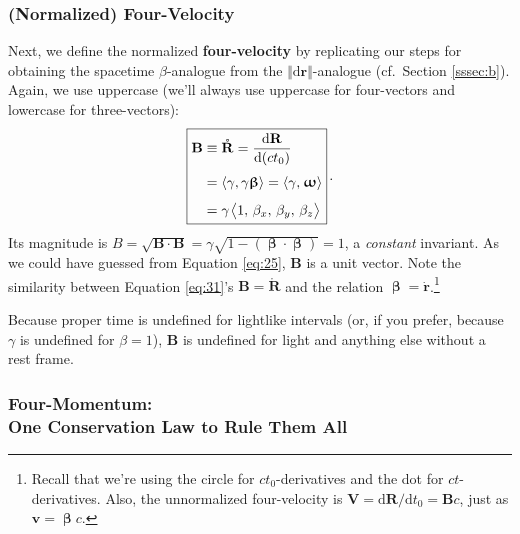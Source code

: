 \documentclass[12pt]{article}
\renewcommand{\vv}[1]{\mathbf{#1}}
\newcommand{\dd}[1]{\mathrm{d}#1}
\newcommand{\vvbeta}{\bm{\upbeta}}
\newcommand{\vvomega}{\bm{\upomega}}
\begin{document}
\subsubsection{(Normalized) Four-Velocity}

Next, we define the normalized \textbf{four-velocity} by replicating our steps for obtaining the spacetime $\beta$-analogue from the $\Vert \dd \vv r \Vert$-analogue (cf.\ Section \ref{sssec:b}). Again, we use uppercase (we'll always use uppercase for four-vectors and lowercase for three-vectors):
\begin{equation}\label{eq:31}
\boxed{
\begin{aligned}
\vv B&\equiv \mathring{\vv R} = \dfrac{\dd \vv R}{\dd (c t_0)} \\[3pt]
&= \langle \gamma, \gamma \vvbeta \rangle = \langle \gamma, \mkern1mu \vvomega \rangle \\[4pt]
&= \gamma \mkern1.5mu \big \langle 1, \, \beta_x, \, \beta_y, \, \beta_z \big \rangle
\end{aligned}
} \, .
\end{equation}
Its magnitude is $B = \sqrt{\vv B \cdot \vv B} = \gamma \sqrt{1 - (\vvbeta \cdot \vvbeta)} = 1$, a \emph{constant} invariant. As we could have guessed from Equation \ref{eq:25}, $\vv B$ is a unit vector. Note the similarity between Equation \ref{eq:31}'s $\vv B = \mathring{\vv R}$ and the relation $\vvbeta = \dot{\vv r}$.\footnote{Recall that we're using the circle for $c t_0$-derivatives and the dot for $ct$-derivatives. Also, the unnormalized four-velocity is $\vv V = \dd \vv R / \dd t_0 = \vv B c$, just as $\vv v = \vvbeta c$.}

Because proper time is undefined for lightlike intervals (or, if you prefer, because $\gamma$ is undefined for $\beta = 1$), $\vv B$ is undefined for light and anything else without a rest frame.


\subsubsection[Four-Momentum: One Conservation Law to Rule Them All]{Four-Momentum:\\ One Conservation Law to Rule Them All}
\end{document}
